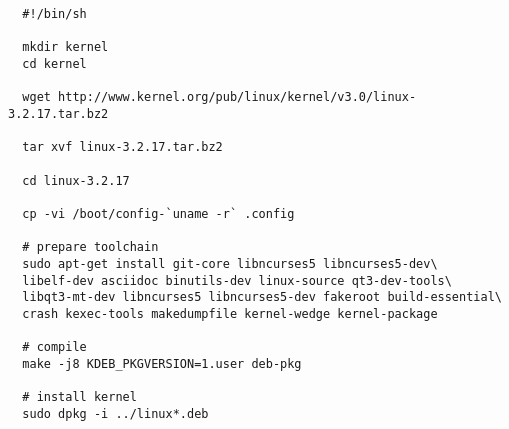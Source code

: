   \begin{verbatim}
  #!/bin/sh

  mkdir kernel
  cd kernel

  wget http://www.kernel.org/pub/linux/kernel/v3.0/linux-3.2.17.tar.bz2

  tar xvf linux-3.2.17.tar.bz2

  cd linux-3.2.17

  cp -vi /boot/config-`uname -r` .config

  # prepare toolchain
  sudo apt-get install git-core libncurses5 libncurses5-dev\
  libelf-dev asciidoc binutils-dev linux-source qt3-dev-tools\ 
  libqt3-mt-dev libncurses5 libncurses5-dev fakeroot build-essential\ 
  crash kexec-tools makedumpfile kernel-wedge kernel-package

  # compile
  make -j8 KDEB_PKGVERSION=1.user deb-pkg

  # install kernel
  sudo dpkg -i ../linux*.deb
  \end{verbatim}